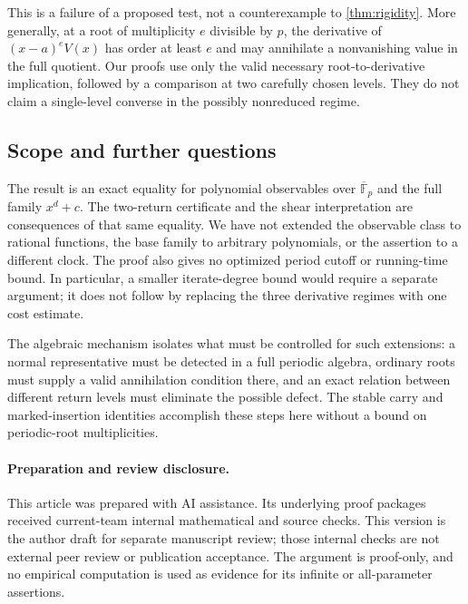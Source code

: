 This is a failure of a proposed test, not a counterexample to
\cref{thm:rigidity}. More generally, at a root of multiplicity
$e$ divisible by $p$, the derivative of
$(x-a)^eV(x)$ has order at least $e$ and may annihilate a
nonvanishing value in the full quotient. Our proofs use only
the valid necessary root-to-derivative implication, followed
by a comparison at two carefully chosen levels. They do not
claim a single-level converse in the possibly nonreduced regime.

\subsection{Scope and further questions}

The result is an exact equality for polynomial observables over
$\overline{\mathbb F}_p$ and the full family $x^d+c$.
The two-return certificate and the shear interpretation are
consequences of that same equality. We have not extended the
observable class to rational functions, the base family to
arbitrary polynomials, or the assertion to a different clock.
The proof also gives no optimized period cutoff or running-time
bound. In particular, a smaller iterate-degree bound would
require a separate argument; it does not follow by replacing
the three derivative regimes with one cost estimate.

The algebraic mechanism isolates what must be controlled for
such extensions: a normal representative must be detected in a
full periodic algebra, ordinary roots must supply a valid
annihilation condition there, and an exact relation between
different return levels must eliminate the possible defect.
The stable carry and marked-insertion identities accomplish
these steps here without a bound on periodic-root multiplicities.

\paragraph{Preparation and review disclosure.}
This article was prepared with AI assistance. Its underlying
proof packages received current-team internal mathematical and
source checks. This version is the author draft for separate
manuscript review; those internal checks are not external peer
review or publication acceptance. The argument is proof-only,
and no empirical computation is used as evidence for its
infinite or all-parameter assertions.
